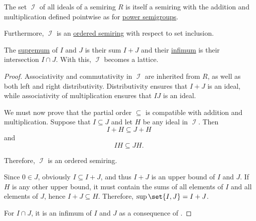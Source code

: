 \begin{proposition}\label{thm:semiring_of_ideals}
  \hfill
  \begin{thmenum}
     The set \( \mscrI \) of all ideals of a semiring \( R \) is itself a semiring with the addition and multiplication defined pointwise as for \hyperref[def:power_semigroup]{power semigroups}.

     Furthermore, \( \mscrI \) is an \hyperref[def:ordered_semiring]{ordered semiring} with respect to set inclusion.

     The \hyperref[def:extremal_points/supremum_and_infimum]{supremum} of \( I \) and \( J \) is their sum \( I + J \) and their \hyperref[def:extremal_points/supremum_and_infimum]{infimum} is their intersection \( I \cap J \). With this, \( \mscrI \) becomes a lattice.
  \end{thmenum}
\end{proposition}
\begin{proof}
   Associativity and commutativity in \( \mscrI \) are inherited from \( R \), as well as both left and right distributivity. Distributivity ensures that \( I + J \) is an ideal, while associativity of multiplication ensures that \( IJ \) is an ideal.

   We must now prove that the partial order \( \subseteq \) is compatible with addition and multiplication. Suppose that \( I \subseteq J \) and let \( H \) be any ideal in \( \mscrI \). Then
  \begin{equation*}
    I + H \subseteq J + H
  \end{equation*}
  and
  \begin{equation*}
    IH \subseteq JH.
  \end{equation*}

  Therefore, \( \mscrI \) is an ordered semiring.

   Since \( 0 \in J \), obviously \( I \subseteq I + J \), and thus \( I + J \) is an upper bound of \( I \) and \( J \). If \( H \) is any other upper bound, it must contain the sums of all elements of \( I \) and all elements of \( J \), hence \( I + J \subseteq H \). Therefore, \( \sup\set{I, J} = I + J \).

  For \( I \cap J \), it is an infimum of \( I \) and \( J \) as a consequence of .
\end{proof}


